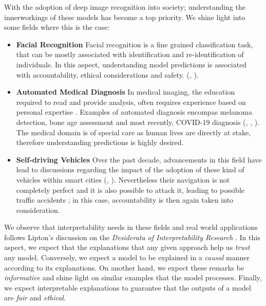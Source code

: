 \noindent With the adoption of deep image recognition into society; understanding the 
innerworkings of these models has become a top priority. We shine light into some fields where 
this is the case:
\begin{itemize}
    \item \textbf{Facial Recognition} Facial recognition is a fine grained classification task, 
    that can be mostly associated with identification and re-identification of individuals. 
    In this aspect, understanding model predictions is associated with accountability, ethical 
    considerations and safety.
    (\cite{selinger2020inconsentability}, \cite{andrejevic2020facial}).
    \item \textbf{Automated Medical Diagnosis} In medical imaging, the education 
    required to read and provide analysis, often requires experience based 
    on personal expertise \autocite{nakashima2013visual}. Examples of automated diagnosis encompas 
    melanoma detection, bone age assessment and most recently, COVID-19 diagnosis 
    (\cite{yu2016automated}, \cite{BoNet2019hand}, \cite{huang2021artificial}). The medical domain 
    is of special care as human lives are directly at stake, therefore understanding predictions is 
    highly desired.
    \item \textbf{Self-driving Vehicles} Over the past decade, advancements in this field have lead to 
    discussions regarding the impact of the adoption of these kind of vehicles within smart cities  
    (\cite{duarte2018impact}, \cite{millard2018pedestrians}). Nevertheless their 
    navigation is not completely perfect and it is also possible to attack it, leading to possible 
    traffic accidents \autocite{dixit2016autonomous}; in this case, accountability is then again 
    taken into consideration.
\end{itemize}

We observe that interpretability needs in these fields and real world applications follows 
Lipton's discussion on the \textit{Desiderata of Interpretability Research} 
\autocite{mythos_interp}. In this aspect, we expect that the explanations that any given 
approach help us \emph{trust} any model. Conversely, we expect a model to be explained in a 
\emph{causal} manner according to its explanations. On another hand, 
we expect these remarks be \emph{informative} and shine light on similar examples that the 
model processes. Finally, we expect interpretable explanations to guarantee that the outputs 
of a model are \emph{fair} and \emph{ethical}.

